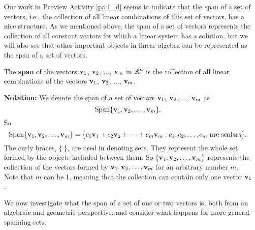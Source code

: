 Our work in Preview Activity \ref{pa:1_d} seems to indicate that the span of a set of vectors, i.e., the collection of all linear combinations of this set of vectors, has a nice structure. As we mentioned above, the span of a set of vectors represents the collection of all constant vectors for which a linear system has a solution, but we will also see that other important objects in linear algebra can be represented as the span of a set of vectors.



\begin{definition} \label{def:1_d_span}  The \textbf{span} of the vectors $\mathbf{v}_1$, $\mathbf{v}_2$, $\ldots$, $\mathbf{v}_m$ in $\mathbb{R}^n$ is the collection of all  linear combinations of the vectors $\mathbf{v}_1$, $\mathbf{v}_2$, $\ldots$, $\mathbf{v}_m$.
\end{definition}



\noindent \textbf{Notation:} We denote the span of a set of vectors $\mathbf{v}_1$, $\mathbf{v}_2$, $\ldots$, $\mathbf{v}_m$ as
\[\text{Span} \{\mathbf{v}_1, \mathbf{v}_2, \ldots, \mathbf{v}_m\} .\]
So
\[\text{Span} \{\mathbf{v}_1, \mathbf{v}_2, \ldots, \mathbf{v}_m\}  = \{c_1\mathbf{v}_1+c_2\mathbf{v}_2 + \cdots + c_m \mathbf{v}_m : c_1, c_2, \ldots, c_m \text{ are scalars}\}.\]
The curly braces, $\{ \; \}$, are used in denoting sets. They represent the whole set formed by the objects included between them. So $\{\mathbf{v}_1, \mathbf{v}_2, \ldots, \mathbf{v}_m\}$ represents the collection of the vectors formed by $\mathbf{v}_1, \mathbf{v}_2, \ldots, \mathbf{v}_m$ for an arbitrary number $m$. Note that $m$ can be 1, meaning that the collection can contain only one vector $\mathbf{v}_1$.



We now investigate what the span of a set of one or two vectors is, both from an algebraic and geometric perspective, and consider what happens for more general spanning sets.


